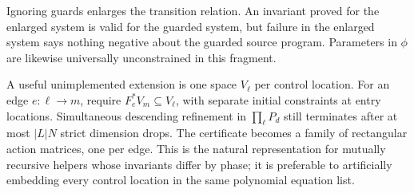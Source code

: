 Ignoring guards enlarges the transition relation. An invariant proved for the
enlarged system is valid for the guarded system, but failure in the enlarged
system says nothing negative about the guarded source program. Parameters in
$\phi$ are likewise universally unconstrained in this fragment.

A useful unimplemented extension is one space $V_\ell$ per control location.
For an edge $e:\ell\to m$, require $F_e^*V_m\subseteq V_\ell$, with separate
initial constraints at entry locations. Simultaneous descending refinement in
$\prod_\ell P_d$ still terminates after at most $|L|N$ strict dimension drops.
The certificate becomes a family of rectangular action matrices, one per edge.
This is the natural representation for mutually recursive helpers whose
invariants differ by phase; it is preferable to artificially embedding every
control location in the same polynomial equation list.
